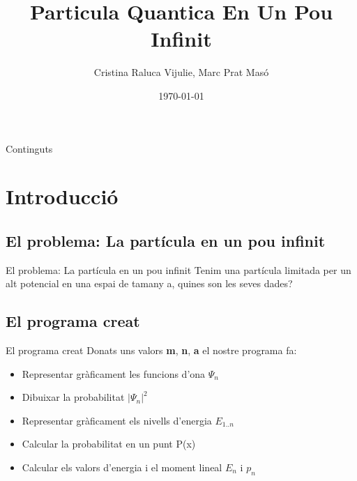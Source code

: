 \documentclass{beamer}
\title[box presentation 1]{Particula Quantica En Un Pou Infinit}
\author{Cristina Raluca Vijulie, Marc Prat Masó}
\institute{Universitat Politecnica de Catalunya}
\date{\today}
\begin{document}
\begin{frame}
  \titlepage
\end{frame}

\begin{frame}{Continguts}
 \tableofcontents
\end{frame}

\section{Introducció}
\subsection{El problema: La partícula en un pou infinit}

\begin{frame}{El problema: La partícula en un pou infinit}
Tenim una partícula limitada per un alt potencial en una espai de tamany a, quines son les seves dades?
\end{frame}

\subsection{El programa creat}
\begin{frame}{El programa creat}
Donats uns valors \textbf{m}, \textbf{n}, \textbf{a} el nostre programa fa:
\begin{itemize}
    \item Representar gràficament les funcions d'ona $\Psi_n$ 
    \item Dibuixar la probabilitat $|\Psi_n|^2$
    \item Representar gràficament els nivells d'energia  $E_{1..n}$
    \item Calcular la probabilitat en un punt P(x)
    \item Calcular els valors d'energia i el moment lineal $E_n $ i $ p_n$
\end{itemize}
\end{frame}
\end{document}
